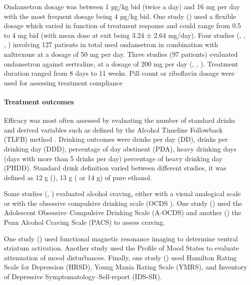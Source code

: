 Ondansetron dosage was between 1 µg/kg bid (twice a day) and 16 mg per day with the most frequent dosage being 4 µg/kg bid. One study (\cite{sherwood_brown_randomized_2021}) used a flexible dosage which varied in function of treatment response and could range from 0.5 to 4 mg bid (with mean dose at exit being 3.24 ± 2.64 mg/day). Four studies (\cite{johnson_combining_2000}, \cite{ait-daoud_combining_2001}, \cite{ait-daoud_combining_2001-1}, \cite{myrick_effect_2008}) involving 127 patients in total used ondansetron in combination with naltrexone at a dosage of 50 mg per day. Three studies (97 patients) evaluated ondansetron against sertraline, at a dosage of  200 mg per day (\cite{kenna_within-group_2009}, \cite{kenna_ondansetron_2014}, \cite{kenna_ondansetron_2014-1}).
Treatment duration ranged from 8 days to 11 weeks. Pill count or riboflavin dosage were used for assessing treatment compliance


\paragraph{Treatment outcomes} 
Efficacy was most often assessed by evaluating the number of standard drinks and derived variables such as defined by the Alcohol Timeline Followback (TLFB) method \cite{sobell1996timeline}. Drinking outcomes were drinks per day (DD), drinks per drinking day (DDD), percentage of day abstinent (PDA), heavy drinking days (days with more than 5 drinks per day) percentage of heavy drinking day (PHDD). Standard drink definition varied between different studies, it was defined as 12 g (\cite{johnson_ondansetron_2000}\cite{johnson_pharmacogenetic_2011}), 13 g (\cite{sellers_clinical_1994} or 14 g\cite{correa_filho_pilot_2013}) of pure ethanol.

Some studies (\cite{ait-daoud_combining_2001}, \cite{johnson_ondansetron_2002}\cite{myrick_effect_2008}) evaluated alcohol craving, either with a visual analogical scale or with the obsessive compulsive drinking scale (OCDS \cite{anton1996obsessive}). One study (\cite{dawes_reductions_2005}) used the Adolescent Obsessive–Compulsive Drinking Scale (A-OCDS) and another (\cite{sherwood_brown_randomized_2021}) the Penn Alcohol Craving Scale (PACS) to assess craving.

One study (\cite{myrick_effect_2008}) used functional magnetic resonance imaging to determine ventral striatum activation. Another study used the Profile of Mood States \cite{mcnair1989profile} to evaluate attenuation of mood disturbances.
Finally, one study (\cite{sherwood_brown_randomized_2021}) used Hamilton Rating Scale for Depression (HRSD), Young Mania Rating Scale (YMRS), and Inventory of Depressive Symptomatology–Self-report (IDS-SR).

